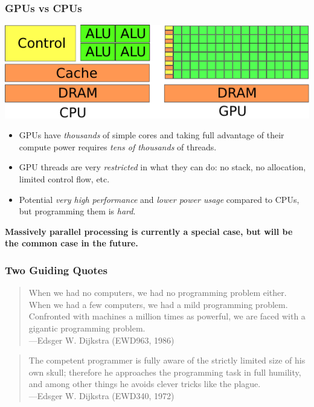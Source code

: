 \documentclass[rgb,dvipsnames]{beamer}
\begin{document}
\begin{frame}
  \frametitle{GPUs vs CPUs}

  \includegraphics[width=\textwidth]{img/cpu-gpu-architecture.pdf}

  \begin{itemize}
  \item GPUs have \textit{thousands} of simple cores and taking full
    advantage of their compute power requires \textit{tens of
      thousands} of threads.
  \item GPU threads are very \textit{restricted} in what they can do:
    no stack, no allocation, limited control flow, etc.
  \item Potential \textit{very high performance} and \textit{lower
      power usage} compared to CPUs, but programming them is
    \textit{hard}.
  \end{itemize}

  \textbf{Massively parallel processing is currently a special case,
    but will be the common case in the future.}
\end{frame}

\begin{frame}
  \frametitle{Two Guiding Quotes}

  \begin{quote}
    When we had no computers, we had no programming problem
    either. When we had a few computers, we had a mild programming
    problem. Confronted with machines a million times as powerful, we
    are faced with a gigantic programming problem.\\\hfill ---Edsger
    W. Dijkstra (EWD963, 1986)
  \end{quote}

  \pause

  \begin{quote}
    The competent programmer is fully aware of the strictly limited
    size of his own skull; therefore he approaches the programming
    task in full humility, and among other things he avoids clever
    tricks like the plague.\\\hfill ---Edsger W. Dijkstra (EWD340, 1972)
  \end{quote}

\end{frame}
\end{document}
